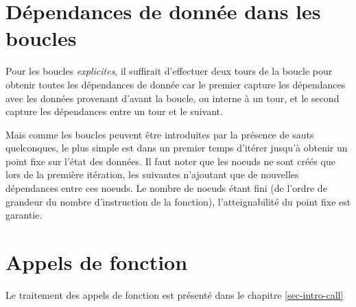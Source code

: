 \section{Dépendances de donnée dans les boucles}

Pour les boucles {\it explicites}, il suffirait d'effectuer deux tours
de la boucle pour obtenir toutes les dépendances de donnée car le premier
capture les dépendances avec les données provenant d'avant la boucle,
ou interne à un tour, et le second capture les dépendances entre un tour et le
suivant.

Mais comme les boucles peuvent être introduites par la présence de sauts
quelconques,
le plus simple est dans un premier temps d'itérer jusqu'à obtenir un point fixe
sur l'état des données. Il faut noter que les noeuds ne sont créés que lors de la
première itération, les suivantes n'ajoutant que de nouvelles dépendances entre
ces noeuds. Le nombre de noeuds étant fini (de l'ordre de grandeur du nombre
d'instruction de la fonction), l'atteignabilité du point fixe est
garantie.

\section{Appels de fonction}

Le traitement des appels de fonction est présenté
dans le chapitre \ref{sec-intro-call}
